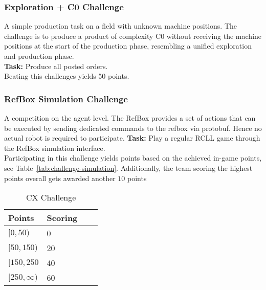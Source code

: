 \documentclass[12pt,twoside]{article}
\newcommand{\reftab}[1]{Table~\ref{#1}}
\begin{document}
\subsubsection{Exploration + C0 Challenge}\label{sec:challenge-combine-exp-c0}
A simple production task on a field with unknown machine positions.
The challenge is to produce a product of complexity C0 without receiving the
machine positions at the start of the production phase, resembling a unified
exploration and production phase.\\
\textbf{Task:} Produce all posted orders.\\
Beating this challenges yields 50 points.

\subsubsection{RefBox Simulation Challenge}\label{sec:challenge-simulation}
A competition on the agent level. The RefBox provides a set of actions
that can be executed by sending dedicated commands to the refbox via protobuf.
Hence no actual robot is required to participate.
\textbf{Task:} Play a regular RCLL game through the RefBox simulation
interface.\\
Participating in this challenge yields points based on the achieved in-game
points, see \reftab{tab:challenge-simulation}.
Additionally, the team scoring the highest points overall gets awarded another
$10$ points
\begin{table}[!htb]
    \centering
        \begin{tabular}{l|l|l|l}
					Points & Scoring \\\hline
					$[0,50)$ & 0\\
					$[50,150)$ & 20\\
					$[150,250$ & 40 \\
					$[250,\infty)$ & 60 \\
        \end{tabular}
    \caption{CX Challenge}
    \label{tab:challenge-cx}
\end{table}
\end{document}
